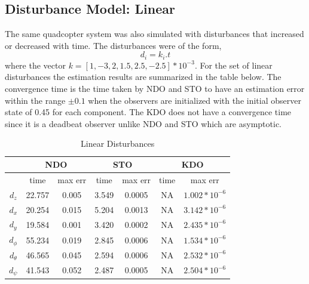 \documentclass[letterpaper%
, twoside%
, 12pt%
,memoire%
, english%
,creativecommons,hyperref%
]{thETS}
\begin{document}
\subsection{Disturbance Model: Linear}
The same quadcopter system was also simulated with disturbances that increased or decreased with time. The disturbances were of the form, 
\begin{equation}
d_i = k_i.t
\label{eq:dist_3}
\end{equation}
where the vector $k=[1,-3,2,1.5,2.5,-2.5]*10^{-3}$. 
For the set of linear disturbances the estimation results are summarized in the table below. The convergence time is the time taken by NDO and STO to have an estimation error within the range $\pm0.1$ when the observers are initialized with the initial observer state of 0.45 for each component. The KDO does not have a convergence time since it is a deadbeat observer unlike NDO and STO which are asymptotic.
\begin{table}[!htbp]
\centering
\caption{Linear Disturbances}
\begin{tabular}{*7c}
\toprule
{} &  \multicolumn{2}{c}{NDO} & \multicolumn{2}{c}{STO} & \multicolumn{2}{c}{KDO}\\
\midrule
{}        &   time   & max err  & time  & max err& time  & max err\\
$d_z$     &  22.757 & 0.005   & 3.549  & 0.0005 & NA     & $1.002*10^{-6}$\\
$d_x$     &  20.254 & 0.015   & 5.204  & 0.0013 & NA     & $3.142*10^{-6}$\\
$d_y$     &  19.584 & 0.001   & 3.420  & 0.0002 & NA     & $2.435*10^{-6}$\\
$d_\phi$  &  55.234 & 0.019   & 2.845  & 0.0006 & NA     & $1.534*10^{-6}$\\
$d_\theta$&  46.565 & 0.045   & 2.594  & 0.0006 & NA     & $2.532*10^{-6}$\\
$d_\psi$  &  41.543 & 0.052   & 2.487  & 0.0005 & NA     & $2.504*10^{-6}$\\
\bottomrule
\end{tabular}
\end{table}
\end{document}
